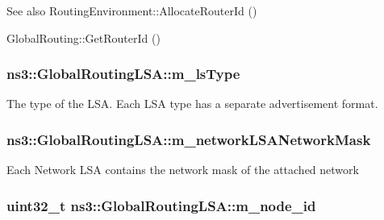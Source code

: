 \begin{DoxySeeAlso}{See also}
Routing\+Environment\+::\+Allocate\+Router\+Id () 

Global\+Routing\+::\+Get\+Router\+Id () 
\end{DoxySeeAlso}
\subsubsection[{\texorpdfstring{m\+\_\+ls\+Type}{m_lsType}}]{ ns3\+::\+Global\+Routing\+L\+S\+A\+::m\+\_\+ls\+Type\hspace{0.3cm}{\ttfamily [private]}}\hypertarget{classns3_1_1GlobalRoutingLSA_a9fdb1b0a15b7b25dfb462a6cc0a04d8b}{}\label{classns3_1_1GlobalRoutingLSA_a9fdb1b0a15b7b25dfb462a6cc0a04d8b}
The type of the L\+SA. Each L\+SA type has a separate advertisement format. 
\subsubsection[{\texorpdfstring{m\+\_\+network\+L\+S\+A\+Network\+Mask}{m_networkLSANetworkMask}}]{ ns3\+::\+Global\+Routing\+L\+S\+A\+::m\+\_\+network\+L\+S\+A\+Network\+Mask\hspace{0.3cm}{\ttfamily [private]}}\hypertarget{classns3_1_1GlobalRoutingLSA_ad5a4590c0997ed0e67f4d46ad0b2decf}{}\label{classns3_1_1GlobalRoutingLSA_ad5a4590c0997ed0e67f4d46ad0b2decf}
Each Network L\+SA contains the network mask of the attached network 
\subsubsection[{\texorpdfstring{m\+\_\+node\+\_\+id}{m_node_id}}]{\setlength{\rightskip}{0pt plus 5cm}uint32\+\_\+t ns3\+::\+Global\+Routing\+L\+S\+A\+::m\+\_\+node\+\_\+id\hspace{0.3cm}{\ttfamily [private]}}\hypertarget{classns3_1_1GlobalRoutingLSA_a0c9199f2382920867bc1120b1d2554a2}{}\label{classns3_1_1GlobalRoutingLSA_a0c9199f2382920867bc1120b1d2554a2}


